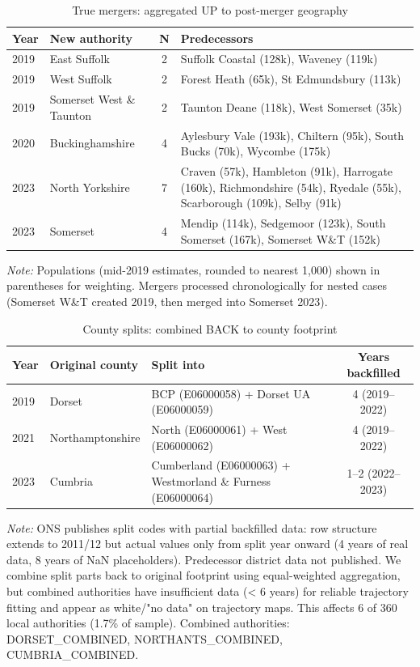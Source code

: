 \documentclass[12pt,a4paper]{article}
\begin{document}
\begin{table}[H]
\centering
\caption{True mergers: aggregated UP to post-merger geography}
\label{tab:mergers}
\footnotesize
\begin{tabular}{p{1.2cm}p{4.5cm}cp{6cm}}
\toprule
Year & New authority & N & Predecessors \\
\midrule
2019 & East Suffolk & 2 & Suffolk Coastal (128k), Waveney (119k) \\
2019 & West Suffolk & 2 & Forest Heath (65k), St Edmundsbury (113k) \\
2019 & Somerset West \& Taunton & 2 & Taunton Deane (118k), West Somerset (35k) \\
2020 & Buckinghamshire & 4 & Aylesbury Vale (193k), Chiltern (95k), South Bucks (70k), Wycombe (175k) \\
2023 & North Yorkshire & 7 & Craven (57k), Hambleton (91k), Harrogate (160k), Richmondshire (54k), Ryedale (55k), Scarborough (109k), Selby (91k) \\
2023 & Somerset & 4 & Mendip (114k), Sedgemoor (123k), South Somerset (167k), Somerset W\&T (152k) \\
\bottomrule
\end{tabular}
\begin{flushleft}
\small\textit{Note:} Populations (mid-2019 estimates, rounded to nearest 1,000) shown in parentheses for weighting. Mergers processed chronologically for nested cases (Somerset W\&T created 2019, then merged into Somerset 2023).
\end{flushleft}
\end{table}

\begin{table}[H]
\centering
\caption{County splits: combined BACK to county footprint}
\label{tab:splits}
\small
\begin{tabular}{p{1.8cm}p{5.5cm}p{5.5cm}c}
\toprule
Year & Original county & Split into & Years backfilled \\
\midrule
2019 & Dorset & BCP (E06000058) + Dorset UA (E06000059) & 4 (2019--2022) \\
2021 & Northamptonshire & North (E06000061) + West (E06000062) & 4 (2019--2022) \\
2023 & Cumbria & Cumberland (E06000063) + Westmorland \& Furness (E06000064) & 1--2 (2022--2023) \\
\bottomrule
\end{tabular}
\begin{flushleft}
\small\textit{Note:} ONS publishes split codes with partial backfilled data: row structure extends to 2011/12 but actual values only from split year onward (4 years of real data, 8 years of NaN placeholders). Predecessor district data not published. We combine split parts back to original footprint using equal-weighted aggregation, but combined authorities have insufficient data (< 6 years) for reliable trajectory fitting and appear as white/"no data" on trajectory maps. This affects 6 of 360 local authorities (1.7\% of sample). Combined authorities: DORSET\_COMBINED, NORTHANTS\_COMBINED, CUMBRIA\_COMBINED.
\end{flushleft}
\end{table}
\end{document}
